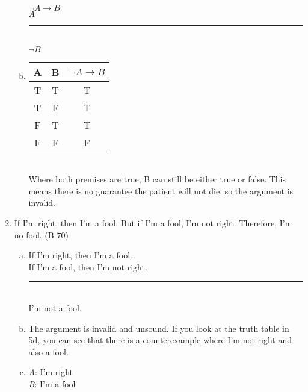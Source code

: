 \documentclass{article}
\begin{document}
\begin{enumerate}
\begin{enumerate}[(a)]
                        $\neg A \to B$\\
                        $A$\\
                        \rule{5em}{.5pt}\\
                        $\neg B$
                  \item
                        \begin{tabular}{c|c|c}
                              A                      & B & $\neg A \to B$ \\
                              \hline
                              T                      & T & T              \\
                              T                      & F & T              \\
                              \rowcolor{lightgray} F & T & T              \\
                              \rowcolor{lightgray} F & F & F
                        \end{tabular} \\
                        Where both premises are true, B can still be either true or false. This means there is no guarantee the patient will not die, so the argument is invalid.
            \end{enumerate}
      \item If I'm right, then I'm a fool. But if I'm a fool, I'm not right. Therefore, I'm no fool. (B 70)
            \begin{enumerate}[(a)]
                  \item If I'm right, then I'm a fool.\\
                        If I'm a fool, then I'm not right.\\
                        \rule{15em}{.5pt}\\
                        I'm not a fool.
                  \item The argument is invalid and unsound. If you look at the truth table in 5d, you can see that there is a counterexample where I'm not right and also a fool.
                  \item \textit{A}: I'm right\\
                        \textit{B}: I'm a fool\\


\end{enumerate}
\end{enumerate}
\end{document}
